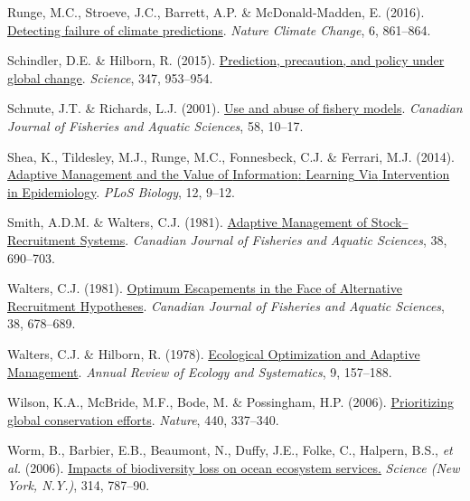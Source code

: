 \documentclass[3p]{elsarticle} %
\newlength{\cslhangindent}
\newenvironment{CSLReferences}[2] %
 {%
  \setlength{\parindent}{0pt}
  \ifodd #1 \everypar{\setlength{\hangindent}{\cslhangindent}}\ignorespaces\fi
  \ifnum #2 > 0
  \setlength{\parskip}{#2\baselineskip}
  \fi
 }%
 {}
\begin{document}
\begin{CSLReferences}{1}{0}
\leavevmode{}%
Runge, M.C., Stroeve, J.C., Barrett, A.P. \& McDonald-Madden, E. (2016).
\href{https://doi.org/10.1038/nclimate3041}{Detecting failure of climate
predictions}. \emph{Nature Climate Change}, 6, 861--864.

\leavevmode{}%
Schindler, D.E. \& Hilborn, R. (2015).
\href{https://doi.org/10.1126/science.1261824}{Prediction, precaution,
and policy under global change}. \emph{Science}, 347, 953--954.

\leavevmode{}%
Schnute, J.T. \& Richards, L.J. (2001).
\href{https://doi.org/10.1139/f00-150}{Use and abuse of fishery models}.
\emph{Canadian Journal of Fisheries and Aquatic Sciences}, 58, 10--17.

\leavevmode{}%
Shea, K., Tildesley, M.J., Runge, M.C., Fonnesbeck, C.J. \& Ferrari,
M.J. (2014).
\href{https://doi.org/10.1371/journal.pbio.1001970}{Adaptive
{Management} and the {Value} of {Information}: {Learning} {Via}
{Intervention} in {Epidemiology}}. \emph{PLoS Biology}, 12, 9--12.

\leavevmode{}%
Smith, A.D.M. \& Walters, C.J. (1981).
\href{https://doi.org/10.1139/f81-092}{Adaptive {Management} of
{Stock}--{Recruitment} {Systems}}. \emph{Canadian Journal of Fisheries
and Aquatic Sciences}, 38, 690--703.

\leavevmode{}%
Walters, C.J. (1981). \href{https://doi.org/10.1139/f81-091}{Optimum
{Escapements} in the {Face} of {Alternative} {Recruitment}
{Hypotheses}}. \emph{Canadian Journal of Fisheries and Aquatic
Sciences}, 38, 678--689.

\leavevmode{}%
Walters, C.J. \& Hilborn, R. (1978).
\href{https://doi.org/10.1146/annurev.es.09.110178.001105}{Ecological
{Optimization} and {Adaptive} {Management}}. \emph{Annual Review of
Ecology and Systematics}, 9, 157--188.

\leavevmode{}%
Wilson, K.A., McBride, M.F., Bode, M. \& Possingham, H.P. (2006).
\href{https://doi.org/10.1038/nature04366}{Prioritizing global
conservation efforts}. \emph{Nature}, 440, 337--340.

\leavevmode{}%
Worm, B., Barbier, E.B., Beaumont, N., Duffy, J.E., Folke, C., Halpern,
B.S., \emph{et al.} (2006).
\href{https://doi.org/10.1126/science.1132294}{{Impacts of biodiversity
loss on ocean ecosystem services.}} \emph{Science (New York, N.Y.)},
314, 787--90.


\end{CSLReferences}
\end{document}
